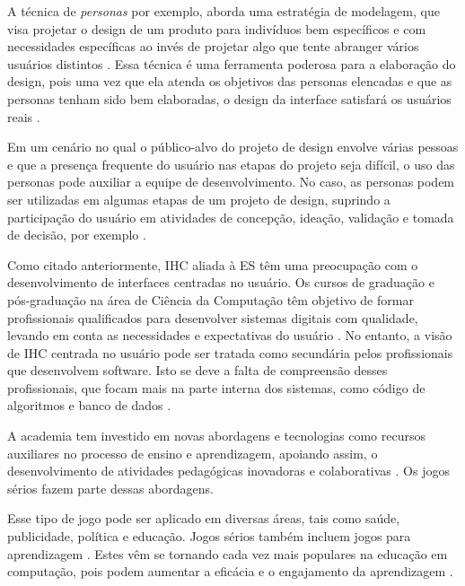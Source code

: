 A técnica de \textit{personas} por exemplo, aborda uma estratégia de modelagem, que visa projetar o design de um produto para indivíduos bem específicos e com necessidades específicas ao invés de projetar algo que tente abranger vários usuários distintos \cite[p. 77]{cooper07}. Essa técnica é uma ferramenta poderosa para a elaboração do design, pois uma vez que ela atenda os objetivos das personas elencadas e que as personas tenham sido bem elaboradas, o design da interface satisfará os usuários reais \cite[p. 77]{cooper07}.

Em um cenário no qual o público-alvo do projeto de design envolve várias pessoas e que a presença frequente do usuário nas etapas do projeto seja difícil, o uso das personas pode auxiliar a equipe de desenvolvimento. No caso, as personas podem ser utilizadas em algumas etapas de um projeto de design, suprindo a participação do usuário em atividades de concepção, ideação, validação e tomada de decisão, por exemplo \cite[p. 80]{Vianna_2014} \cite[p. 155]{BarbosaEtAl2021}.

Como citado anteriormente, IHC aliada à ES têm uma preocupação com o desenvolvimento de interfaces centradas no usuário. Os cursos de graduação e pós-graduação na área de Ciência da Computação têm objetivo de formar profissionais qualificados para desenvolver sistemas digitais com qualidade, levando em conta as necessidades e expectativas do usuário \cite[p. 89,  90]{acm_curricula} \cite[p. 8-16]{BarbosaEtAl2021}. No entanto, a visão de IHC centrada no usuário pode ser tratada como secundária pelos profissionais que desenvolvem software. Isto se deve a falta de compreensão desses profissionais, que focam mais na parte interna dos sistemas, como código de algoritmos e banco de dados \cite{sommariva}.

A academia tem investido em novas abordagens e tecnologias como recursos auxiliares no processo de ensino e aprendizagem, apoiando assim, o desenvolvimento de atividades pedagógicas inovadoras e colaborativas \cite{battistella, brito, Sales2020, Sales2020UsoTDS}. Os jogos sérios fazem parte dessas abordagens.

Esse tipo de jogo pode ser aplicado em diversas áreas, tais como saúde, publicidade, política e educação. Jogos sérios também incluem jogos para aprendizagem \cite{Becker_2021}. Estes vêm se tornando cada vez mais populares na educação em computação, pois podem aumentar a eficácia e o engajamento da aprendizagem \cite{battistella, brito, queiroz, sales_climaco2016}.

